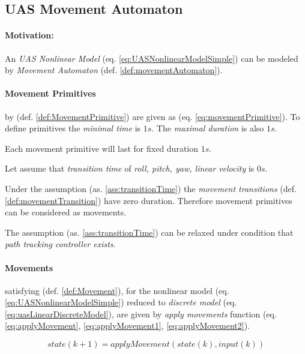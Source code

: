 \subsection{UAS Movement Automaton}\label{s:movementAutomatonDefinition}

\paragraph{Motivation:} An \emph{UAS Nonlinear Model} (eq. \ref{eq:UASNonlinearModelSimple}) can be modeled by \emph{Movement Automaton} (def. \ref{def:movementAutomaton}). 

\paragraph{Movement Primitives} by (def. \ref{def:MovementPrimitive})  are given as (eq. \ref{eq:movementPrimitive}). To define primitives the \emph{minimal time} is $1 s$. The \emph{maximal duration} is also $1s$.

\begin{note}
	Each movement primitive will last for fixed duration $1s$.
\end{note} 

\begin{assumption}\label{ass:transitionTime}
    Let assume that \emph{transition time} of \emph{roll, pitch, yaw, linear velocity} is $0 s$.
\end{assumption}

Under the assumption (as. \ref{ass:transitionTime}) the \emph{movement transitions} (def. \ref{def:movementTransition}) have zero duration. Therefore movement primitives can be considered as movements.

\begin{note}
    The assumption (as. \ref{ass:transitionTime}) can be relaxed under condition that \emph{path tracking controller exists}.
\end{note}

\paragraph{Movements} satisfying (def. \ref{def:Movement}), for the nonlinear model (eq. \ref{eq:UASNonlinearModelSimple}) reduced to \emph{discrete model} (eq. \ref{eq:uasLinearDiscreteModel}), are given by \emph{apply movements} function (eq. \ref{eq:applyMovement}, \ref{eq:applyMovement1}, \ref{eq:applyMovement2}).

\begin{equation}\label{eq:uasLinearDiscreteModel}
    state(k+1) = applyMovement(state(k), input(k)) 
\end{equation}

